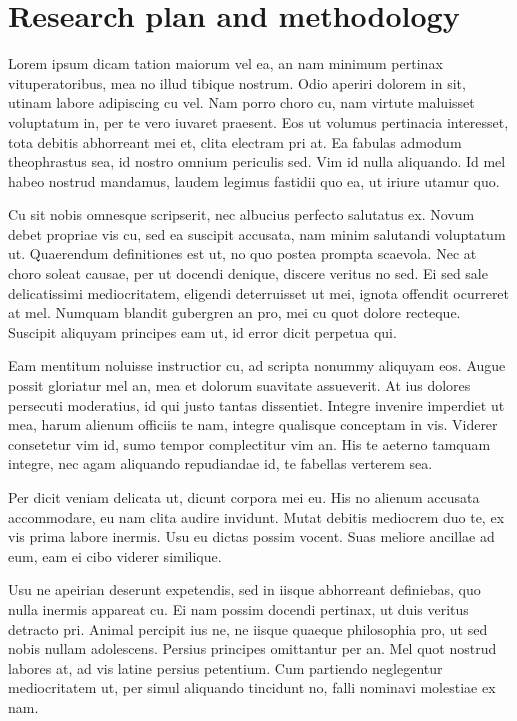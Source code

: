 \chapter{Research plan and methodology}

Lorem ipsum dicam tation maiorum vel ea, an nam minimum pertinax vituperatoribus, mea no illud tibique nostrum. Odio aperiri dolorem in sit, utinam labore adipiscing cu vel. Nam porro choro cu, nam virtute maluisset voluptatum in, per te vero iuvaret praesent. Eos ut volumus pertinacia interesset, tota debitis abhorreant mei et, clita electram pri at. Ea fabulas admodum theophrastus sea, id nostro omnium periculis sed. Vim id nulla aliquando. Id mel habeo nostrud mandamus, laudem legimus fastidii quo ea, ut iriure utamur quo.

Cu sit nobis omnesque scripserit, nec albucius perfecto salutatus ex. Novum debet propriae vis cu, sed ea suscipit accusata, nam minim salutandi voluptatum ut. Quaerendum definitiones est ut, no quo postea prompta scaevola. Nec at choro soleat causae, per ut docendi denique, discere veritus no sed. Ei sed sale delicatissimi mediocritatem, eligendi deterruisset ut mei, ignota offendit ocurreret at mel. Numquam blandit gubergren an pro, mei cu quot dolore recteque. Suscipit aliquyam principes eam ut, id error dicit perpetua qui.

Eam mentitum noluisse instructior cu, ad scripta nonummy aliquyam eos. Augue possit gloriatur mel an, mea et dolorum suavitate assueverit. At ius dolores persecuti moderatius, id qui justo tantas dissentiet. Integre invenire imperdiet ut mea, harum alienum officiis te nam, integre qualisque conceptam in vis. Viderer consetetur vim id, sumo tempor complectitur vim an. His te aeterno tamquam integre, nec agam aliquando repudiandae id, te fabellas verterem sea.

Per dicit veniam delicata ut, dicunt corpora mei eu. His no alienum accusata accommodare, eu nam clita audire invidunt. Mutat debitis mediocrem duo te, ex vis prima labore inermis. Usu eu dictas possim vocent. Suas meliore ancillae ad eum, eam ei cibo viderer similique.

Usu ne apeirian deserunt expetendis, sed in iisque abhorreant definiebas, quo nulla inermis appareat cu. Ei nam possim docendi pertinax, ut duis veritus detracto pri. Animal percipit ius ne, ne iisque quaeque philosophia pro, ut sed nobis nullam adolescens. Persius principes omittantur per an. Mel quot nostrud labores at, ad vis latine persius petentium. Cum partiendo neglegentur mediocritatem ut, per simul aliquando tincidunt no, falli nominavi molestiae ex nam.

